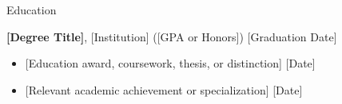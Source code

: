 \documentclass{resume} %
\begin{document}
\vspace{-0.1in}

\begin{rSection}{Education}

{\bf [Degree Title]}, [Institution] ([GPA or Honors]) \hfill {[Graduation Date]}

\vspace{-3pt}
\begin{itemize}
\itemsep -4pt {}
\item{} [Education award, coursework, thesis, or distinction] \hfill [Date]
\item{} [Relevant academic achievement or specialization] \hfill [Date]
\end{itemize}

\end{rSection}

\end{document}
